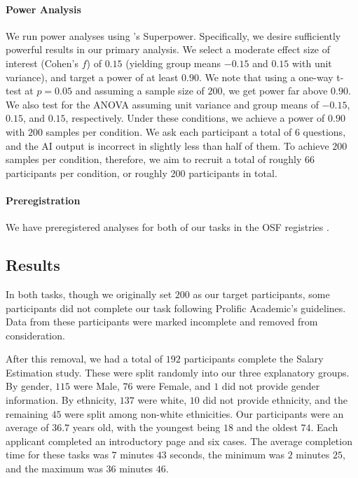 \paragraph{Power Analysis}
We run power analyses using \textcite{caldwell_power_nodate}'s Superpower. Specifically, we desire sufficiently powerful results in our primary analysis. We select a moderate effect size of interest (Cohen’s $f$) of $0.15$ (yielding group means $-0.15$ and $0.15$ with unit variance), and target a power of at least $0.90$. We note that using a one-way t-test at $p = 0.05$ and assuming a sample size of $200$, we get power far above $0.90$. We also test for the ANOVA assuming unit variance and group means of $-0.15$, $0.15$, and $0.15$, respectively. Under these conditions, we achieve a power of $0.90$ with $200$ samples per condition. We ask each participant a total of 6 questions, and the AI output is incorrect in slightly less than half of them. To achieve $200$ samples per condition, therefore, we aim to recruit a total of roughly $66$ participants per condition, or roughly $200$ participants in total.

\paragraph{Preregistration}
We have preregistered analyses for both of our tasks in the OSF registries \cite{natarajan_binns_2022}. 

\subsection{Results}\label{ssec:os_results}
In both tasks, though we originally set $200$ as our target participants, some participants did not complete our task following Prolific Academic's guidelines. Data from these participants were marked incomplete and removed from consideration. 

After this removal, we had a total of $192$ participants complete the Salary Estimation study. These were split randomly into our three explanatory groups. By gender, $115$ were Male, $76$ were Female, and $1$ did not provide gender information. By ethnicity, $137$ were white, $10$ did not provide ethnicity, and the remaining $45$ were split among non-white ethnicities. Our participants were an average of $36.7$ years old, with the youngest being $18$ and the oldest $74$. Each applicant completed an introductory page and six cases. The average completion time for these tasks was $7$ minutes $43$ seconds, the minimum was $2$ minutes $25$, and the maximum was $36$ minutes $46$.

